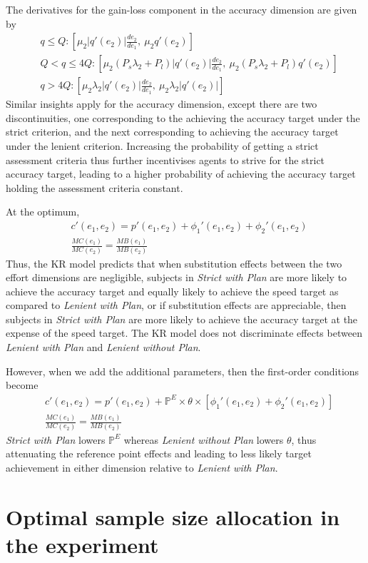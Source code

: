 \documentclass[12pt, letterpaper]{article}
\newcommand{\LPName}{Lenient with Plan}
\newcommand{\SPName}{Strict with Plan}
\newcommand{\LNName}{Lenient without Plan}
\newcommand{\LP}{\textit{\LPName}}
\newcommand{\SP}{\textit{\SPName}}
\newcommand{\LN}{\textit{\LNName}}
\begin{document}
The derivatives for the gain-loss component in the accuracy dimension are given by
\[
\begin{aligned}
& q \leq Q: [\mu_2 |q'(e_2)| \frac {de_2}{de_1}, \: \mu_2 q'(e_2)] \\
& Q < q \leq 4Q: [\mu_2 (P_s \lambda_2 + P_l) |q'(e_2)| \frac {de_2}{de_1}, \: \mu_2 (P_s \lambda_2 + P_l) q'(e_2)] \\
& q > 4Q: [\mu_2 \lambda_2 |q'(e_2)| \frac {de_2}{de_1}, \: \mu_2 \lambda_2 |q'(e_2)|]
\end{aligned}
\]
Similar insights apply for the accuracy dimension, except there are two discontinuities, one corresponding to the achieving the accuracy target under the strict criterion, and the next corresponding to achieving the accuracy target under the lenient criterion. Increasing the probability of getting a strict assessment criteria thus further incentivises agents to strive for the strict accuracy target, leading to a higher probability of achieving the accuracy target holding the assessment criteria constant.

At the optimum,
\[
\begin{aligned}
& c'(e_1, e_2) = p'(e_1, e_2) + \phi_1'(e_1, e_2) + \phi_2'(e_1, e_2) \\
& \frac {MC(e_1)}{MC(e_2)} = \frac {MB(e_1)}{MB(e_2)}
\end{aligned}
\]
Thus, the KR model predicts that when substitution effects between the two effort dimensions are negligible, subjects in \SP{} are more likely to achieve the accuracy target and equally likely to achieve the speed target as compared to \LP{}, or if substitution effects are appreciable, then subjects in \SP{} are more likely to achieve the accuracy target at the expense of the speed target. The KR model does not discriminate effects between \LP{} and \LN{}.

However, when we add the additional parameters, then the first-order conditions become
\[
\begin{aligned}
& c'(e_1, e_2) = p'(e_1, e_2) + \mathbb{P}^E \times \theta \times [\phi_1'(e_1, e_2) + \phi_2'(e_1, e_2)] \\
& \frac {MC(e_1)}{MC(e_2)} = \frac {MB(e_1)}{MB(e_2)}
\end{aligned}
\]
\SP{} lowers $\mathbb{P}^E$ whereas \LN{} lowers $\theta$, thus attenuating the reference point effects and leading to less likely target achievement in either dimension relative to \LP{}.

\section{Optimal sample size allocation in the experiment}\label{app:sample-size}
\end{document}
